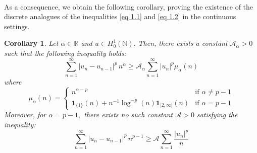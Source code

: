 \documentclass[11pt]{amsart}
\newtheorem{cor}[thm]{Corollary}
\newcommand{\1}{[1]}
\begin{document}
\phantom{.} \\
As a consequence, we obtain the following corollary, proving the existence of the discrete analogues of the inequalities \ref{eq 1.1} and \ref{eq 1.2} in the continuous settings.
\begin{cor} \label{cor 2.4} Let $\alpha \in \mathbb{R}$ and $u \in H_{0}^{1}(\mathbb{N}).$ Then, there exists a constant
$\mathcal{A}_{\alpha}>0$ such that the following inequality holds:
$$\sum_{n=1}^{\infty} |u_{n}-u_{n-1}|^p \, n^{\alpha} \geq  \mathcal{A}_{\alpha} \sum_{n=1}^{\infty} |u_n|^p \mu_{\alpha}(n)$$
where
$$\mu_{\alpha}(n) = 
\begin{cases}
n^{\alpha-p} & \text{if } \alpha \neq p-1 \\
\mathbf{1}_{\{1\}}(n) + n^{-1} \log^{-p}(n) \mathbf{1}_{[2,\infty[}(n)& \text{if } \alpha=p-1
\end{cases}$$
Moreover, for $\alpha =p-1,$ there exists no such constant $\mathcal{A}>0$  satisfying the inequality:
$$\sum_{n=1}^{\infty} |u_{n}-u_{n-1}|^p \, n^{p-1} \geq  \mathcal{A} \sum_{n=1}^{\infty} \frac{|u_n|^p}{n} $$
\end{cor}
\phantom{.}\\
\end{document}
